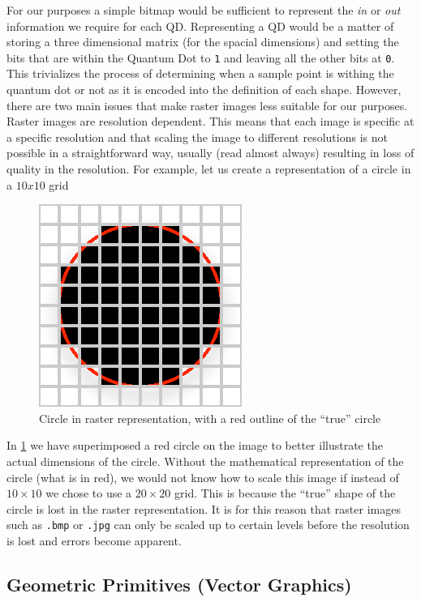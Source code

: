 \documentclass[authoryearcitations]{UoYCSproject}
\begin{document}
For our purposes a simple bitmap would be sufficient to represent the
\emph{in} or \emph{out} information we require for each QD. Representing a QD would be a matter of 
storing a three dimensional matrix (for the spacial dimensions) and setting the bits that are within
the Quantum Dot to \verb+1+ and leaving all the other bits at \verb+0+. This trivializes the process of 
determining when a sample point is withing the quantum dot or not as it is encoded into the definition of 
each shape. However, there are two main
issues that make raster images less suitable for our purposes. Raster images are resolution dependent. This means that
each image is specific at a specific resolution and that scaling the image to different resolutions is not possible in a 
straightforward way, usually (read almost always) resulting in loss of quality in the resolution. For example, let us
create a representation of a circle in a $10x10$ grid

\begin{figure}[h]
  \centering
  \includegraphics[scale=1.0]{figures/rasterCircle.eps}
    \caption{Circle in raster representation, with a red outline of the ``true'' circle}
  \label{rasterCircle}
\end{figure}

In \ref{rasterCircle} we have superimposed a red circle on the image to better illustrate the actual dimensions of the circle. 
Without the mathematical representation of the circle (what is in red), we would not know how to scale this image if instead of
$10 \times 10$ we chose to use a $20 \times 20$ grid. This is because the ``true'' shape of the circle is 
lost in the raster representation.  
It is for this reason that raster images such as \verb+.bmp+ or \verb+.jpg+ can only be scaled up to certain levels before
the resolution is lost and errors become apparent. 


\subsection{Geometric Primitives (Vector Graphics)}
\end{document}
